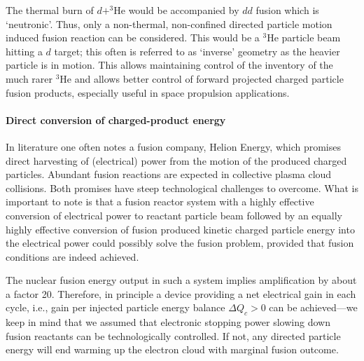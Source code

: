 \documentclass[particles,article,accept,pdftex,moreauthors]{Definitions/mdpi}
\begin{document}
The thermal burn of $d+^{3\!}\mathrm{He}$ would be accompanied by $dd$ fusion which is `neutronic'. Thus, only a non-thermal, non-confined directed particle motion induced fusion reaction can be considered. This would be a ${}^3\mathrm{He}$ particle beam hitting a $d$ target; this often is referred to as `inverse' geometry as the heavier particle is in motion. This allows maintaining control of the inventory of the much rarer ${}^3\mathrm{He}$ and allows better control of forward projected charged particle fusion products, especially useful in space propulsion applications.

\paragraph*{\bf Direct conversion of charged-product energy}
In literature one often notes a fusion company, Helion Energy, which promises direct harvesting of (electrical) power from the motion of the produced charged particles. Abundant fusion reactions are expected in collective plasma cloud collisions. Both promises have steep technological challenges to overcome. What is important to note is that a fusion reactor system with a highly effective conversion of electrical power to reactant particle beam followed by an equally highly effective conversion of fusion produced kinetic charged particle energy into the electrical power could possibly solve the fusion problem, provided that fusion conditions are indeed achieved.

The nuclear fusion energy output in such a system implies amplification by about a factor 20. Therefore, in principle a device providing a net electrical gain in each cycle, i.e., gain per injected particle energy balance $\Delta Q_c>0$ can be achieved---we keep in mind that we assumed that electronic stopping power slowing down fusion reactants can be technologically controlled. If not, any directed particle energy will end warming up the electron cloud with marginal fusion outcome.
\end{document}
